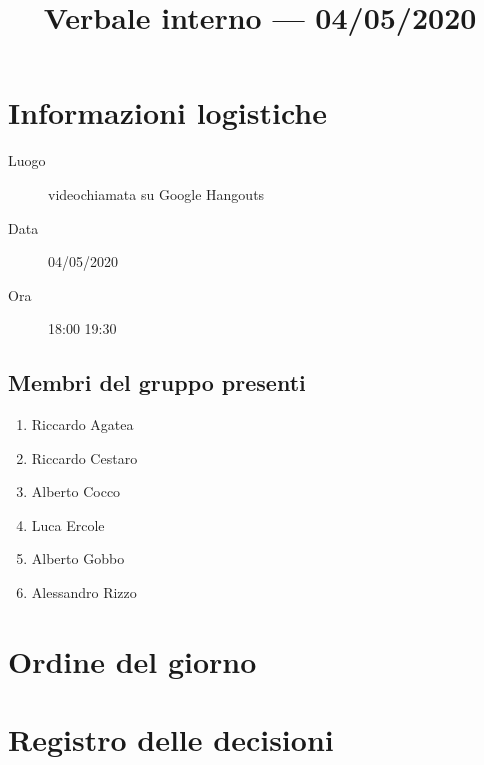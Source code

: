 \documentclass{article}
\title{Verbale interno --- 04/05/2020}
\begin{document}


\section{Informazioni logistiche}%
\label{sec:informazioni_logistiche}

\begin{description}
  \item [Luogo] videochiamata su Google Hangouts
  \item [Data] 04/05/2020
  \item [Ora] 18:00  19:30
\end{description}

\subsection{Membri del gruppo presenti}%
\label{sub:membri_del_gruppo_presenti}

\begin{enumerate}
  \item Riccardo Agatea
  \item Riccardo Cestaro
  \item Alberto Cocco
  \item Luca Ercole
  \item Alberto Gobbo
  \item Alessandro Rizzo
\end{enumerate}

\section{Ordine del giorno}%
\label{sec:ordine_del_giorno}

\newpage
\section{Registro delle decisioni}%
\label{sec:registro_delle_decisioni}

\end{document}

